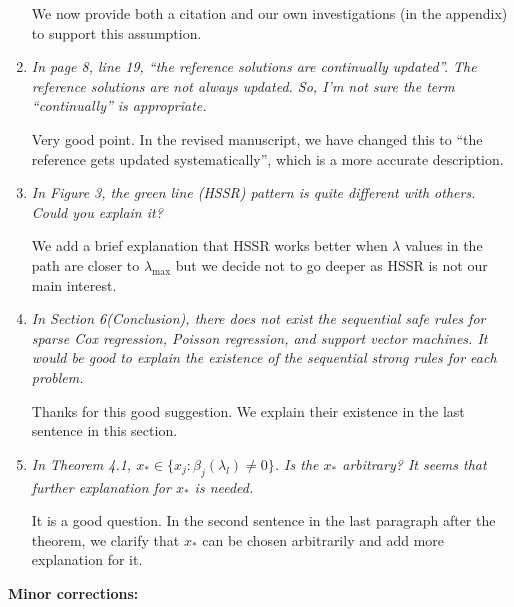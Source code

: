 \documentclass{article}
\begin{document}
\begin{enumerate}
  We now provide both a citation and our own investigations (in the appendix) to support this assumption.

\item \emph{In page 8, line 19, ``the reference solutions are continually updated''. The reference solutions are not always updated. So, I’m not sure the term ``continually'' is appropriate.}

  Very good point. In the revised manuscript, we have changed this to ``the reference gets updated systematically'', which is a more accurate description.

\item \emph{In Figure 3, the green line (HSSR) pattern is quite different with others. Could you explain it?}

    We add a brief explanation that HSSR works better when $\lambda$ values in the path are closer to $\lambda_{\max}$ but we decide not to go deeper as HSSR is not our main interest.

\item \emph{In Section 6(Conclusion), there does not exist the sequential safe rules for sparse Cox regression, Poisson regression, and support vector machines. It would be good to explain the existence of the sequential strong rules for each problem.}
    
    Thanks for this good suggestion. We explain their existence in the last sentence in this section.

\item \emph{In Theorem 4.1, $x_* \in \{ x_j : \hat{\beta}_j(\lambda_l) \ne 0 \}$. Is the $x_*$ arbitrary? It seems that further explanation for $x_*$ is needed.}

    It is a good question. In the second sentence in the last paragraph after the theorem, we clarify that $x_*$ can be chosen arbitrarily and add more explanation for it.

\end{enumerate}

\textbf{Minor corrections:}
\end{document}
